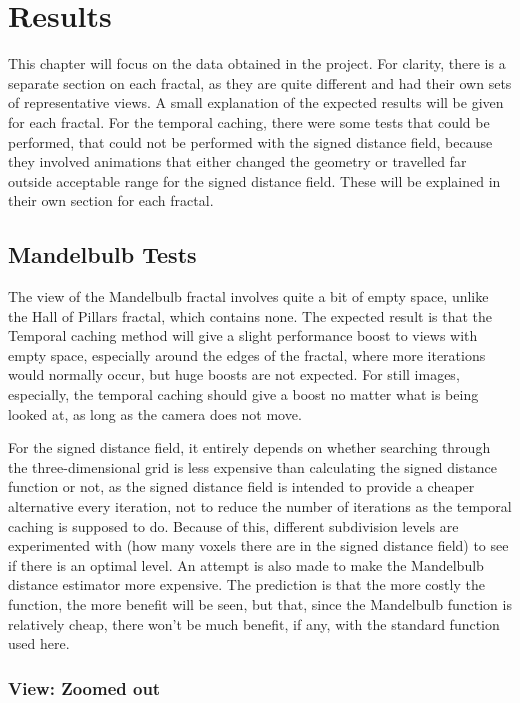 \chapter{Results}
\label{chapter4}

This chapter will focus on the data obtained in the project. For clarity, there is a separate section on each fractal, as they are quite different and had their own sets of representative views. A small explanation of the expected results will be given for each fractal. For the temporal caching, there were some tests that could be performed, that could not be performed with the signed distance field, because they involved animations that either changed the geometry or travelled far outside acceptable range for the signed distance field. These will be explained in their own section for each fractal.

\section{Mandelbulb Tests}

The view of the Mandelbulb fractal involves quite a bit of empty space, unlike the Hall of Pillars fractal, which contains none. The expected result is that the Temporal caching method will give a slight performance boost to views with empty space, especially around the edges of the fractal, where more iterations would normally occur, but huge boosts are not expected. For still images, especially, the temporal caching should give a boost no matter what is being looked at, as long as the camera does not move.\newline

For the signed distance field, it entirely depends on whether searching through the three-dimensional grid is less expensive than calculating the signed distance function or not, as the signed distance field is intended to provide a cheaper alternative every iteration, not to reduce the number of iterations as the temporal caching is supposed to do. Because of this, different subdivision levels are experimented with (how many voxels there are in the signed distance field) to see if there is an optimal level. An attempt is also made to make the Mandelbulb distance estimator more expensive. The prediction is that the more costly the function, the more benefit will be seen, but that, since the Mandelbulb function is relatively cheap, there won't be much benefit, if any, with the standard function used here.

\subsection{View: Zoomed out}

